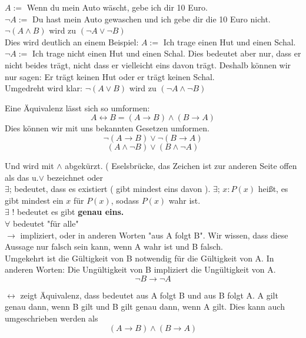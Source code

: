 \documentclass[headsepline,12pt,a4paper]{scrartcl}
\makeatletter
\def\myItem{%
   \@ifnextchar[ \@myItem{\@noitemargtrue\@myItem[\@itemlabel]}}
\def\@myItem[#1]{\item[#1]\mbox{}\\}
\makeatother
\begin{document}
\begin{itemize}
$A:=$ Wenn du mein Auto wäscht, gebe ich dir 10 Euro. \\

$\neg A :=$ Du hast mein Auto gewaschen und ich gebe dir die 10 Euro nicht.\\
$ \neg (A \wedge B ) $ wird zu $ (\neg A \lor \neg B ) $ \\
Dies wird deutlich an einem Beispiel: $A:=$ Ich trage einen Hut und einen Schal. \\
$\neg A:=$ Ich trage nicht einen Hut und einen Schal. Dies bedeutet aber nur, dass er nicht beides trägt, nicht dass er vielleicht eins davon trägt. Deshalb können wir nur sagen: Er trägt keinen Hut oder er trägt keinen Schal. \\
Umgedreht wird klar: $ \neg (A \lor B ) $ wird zu $ (\neg A \wedge \neg B ) $

\begin{center}
\myItem[Äquivalenz negieren]
\end{center}

Eine Äquivalenz lässt sich so umformen: $$ A \leftrightarrow B =  ( A \rightarrow B ) \wedge ( B \rightarrow A ) $$
Dies können wir mit uns bekannten Gesetzen umformen.
 $$ \neg ( A \rightarrow B ) \lor \neg ( B \rightarrow A ) $$
 $$ ( A \wedge \neg B ) \lor ( B \wedge \neg A ) $$


\myItem[Junktionen]
  Und wird mit $\wedge$ abgekürzt. ( Eselsbrücke, das Zeichen ist zur anderen Seite offen als das u.$\lor$ bezeichnet oder \\

\myItem[Quantoren] 
 $\exists$; bedeutet, dass es existiert ( gibt mindest eins davon ). $\exists$; $x : P(x)$ heißt, es gibt mindest ein $x$ für $P(x)$, sodass $P(x)$ wahr ist.\\
 $\exists$ ! bedeutet es gibt \textbf{genau eins.} \\
 $\forall$ bedeutet "für alle" \\

\myItem[Implikation]
 $\rightarrow$ impliziert, oder in anderen Worten "aus A folgt B". Wir wissen, dass diese Aussage nur falsch sein kann, wenn A wahr ist und B falsch.\\

 Umgekehrt ist die Gültigkeit von B notwendig für die Gültigkeit von A. In anderen Worten: Die Ungültigkeit von B impliziert die Ungültigkeit von A. 
 $$ \neg B \rightarrow \neg A $$

 $\leftrightarrow$ zeigt Äquivalenz, dass bedeutet aus A folgt B und aus B folgt A. A gilt genau dann, wenn B gilt und B gilt genau dann, wenn A gilt. Dies kann auch umgeschrieben werden als 
$$ ( A \rightarrow B ) \wedge ( B \rightarrow A ) $$ \\


\end{itemize}
\end{document}
